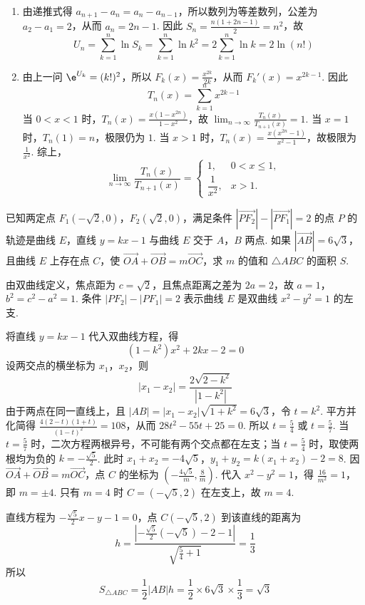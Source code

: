 \begin{solution}
\begin{enumerate}
\item 由递推式得 \(a_{n+1}-a_n=a_n-a_{n-1}\)，所以数列为等差数列，公差为 \(a_2-a_1=2\)，从而 \(a_n=2n-1\). 因此 \(S_n=\frac{n(1+2n-1)}2=n^2\)，故
\[
U_n=\sum_{k=1}^n\ln S_k=\sum_{k=1}^n\ln k^2=2\sum_{k=1}^n\ln k=2\ln(n!)
\]
\item 由上一问 \(\e^{U_k}=(k!)^2\)，所以 \(F_k(x)=\frac{x^{2k}}{2k}\)，从而 \(F_k'(x)=x^{2k-1}\). 因此
\[
T_n(x)=\sum_{k=1}^n x^{2k-1}
\]
当 \(0<x<1\) 时，\(T_n(x)=\frac{x(1-x^{2n})}{1-x^2}\)，故 \(\displaystyle\lim_{n\to\infty}\frac{T_n(x)}{T_{n+1}(x)}=1\). 当 \(x=1\) 时，\(T_n(1)=n\)，极限仍为 \(1\). 当 \(x>1\) 时，\(T_n(x)=\frac{x(x^{2n}-1)}{x^2-1}\)，故极限为 \(\frac1{x^2}\). 综上，
\[
\lim_{n\to\infty}\frac{T_n(x)}{T_{n+1}(x)}=
\begin{cases}
1,&0<x\leqslant1,\\
\dfrac1{x^2},&x>1.
\end{cases}
\]
\end{enumerate}
\end{solution}

\begin{problem}
已知两定点 \(F_{1}(-\sqrt{2},0)\)，\(F_{2}(\sqrt{2},0)\)，满足条件 \(\left|\overrightarrow{PF_2}\right| - \left|\overrightarrow{PF_1}\right| = 2\) 的点 \(P\) 的轨迹是曲线 \(E\)，直线 \(y = kx - 1\) 与曲线 \(E\) 交于 \(A\)，\(B\) 两点. 如果 \(\left|\overrightarrow{AB}\right| = 6\sqrt{3}\)，且曲线 \(E\) 上存在点 \(C\)，使 \(\overrightarrow{OA} + \overrightarrow{OB} = m\overrightarrow{OC}\)，求 \(m\) 的值和 \(\triangle ABC\) 的面积 \(S\).
\end{problem}

\begin{solution}
由双曲线定义，焦点距为 \(c=\sqrt2\)，且焦点距离之差为 \(2a=2\)，故 \(a=1\)，\(b^2=c^2-a^2=1\). 条件 \(|PF_2|-|PF_1|=2\) 表示曲线 \(E\) 是双曲线 \(x^2-y^2=1\) 的左支.

将直线 \(y=kx-1\) 代入双曲线方程，得
\[
(1-k^2)x^2+2kx-2=0
\]
设两交点的横坐标为 \(x_1\)，\(x_2\)，则
\[
|x_1-x_2|=\frac{2\sqrt{2-k^2}}{|1-k^2|}
\]
由于两点在同一直线上，且 \(|AB|=|x_1-x_2|\sqrt{1+k^2}=6\sqrt3\)，令 \(t=k^2\). 平方并化简得
\(\frac{4(2-t)(1+t)}{(1-t)^2}=108\)，从而
\(28t^2-55t+25=0\).
所以 \(t=\frac54\) 或 \(t=\frac57\). 当 \(t=\frac57\) 时，二次方程两根异号，不可能有两个交点都在左支；当 \(t=\frac54\) 时，取使两根均为负的 \(k=-\frac{\sqrt5}{2}\). 此时
\(x_1+x_2=-4\sqrt5\)，\(y_1+y_2=k(x_1+x_2)-2=8\).
因 \(\overrightarrow{OA}+\overrightarrow{OB}=m\overrightarrow{OC}\)，点 \(C\) 的坐标为 \(\left(-\frac{4\sqrt5}{m},\frac8m\right)\). 代入 \(x^2-y^2=1\)，得 \(\frac{16}{m^2}=1\)，即 \(m=\pm4\). 只有 \(m=4\) 时 \(C=(-\sqrt5,2)\) 在左支上，故 \(m=4\).

直线方程为 \(-\frac{\sqrt5}{2}x-y-1=0\)，点 \(C(-\sqrt5,2)\) 到该直线的距离为
\[
h=\frac{\left|-\frac{\sqrt5}{2}(-\sqrt5)-2-1\right|}{\sqrt{\frac54+1}}=\frac13
\]
所以
\[
S_{\triangle ABC}=\frac12|AB|h=\frac12\times6\sqrt3\times\frac13=\sqrt3
\]
\end{solution}

